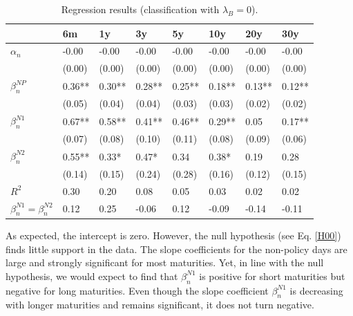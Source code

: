 \documentclass[11pt,a4paper,english,oneside]{book}
\numberwithin{equation}{chapter}
\begin{document}
\begin{table}[h] %
	\centering %
	\begin{tabular}{ p{2cm}  p{1cm} p{1cm} p{1cm} p{1cm} p{1cm} p{1cm} p{1cm} } %
		\toprule %
		& 6m & 1y & 3y & 5y & 10y & 20y & 30y \\
		\midrule %
		$\alpha_n$ & -0.00 & -0.00 & -0.00 & -0.00 & -0.00 & -0.00 & -0.00\\
		& (0.00) & (0.00) & (0.00) & (0.00) & (0.00) & (0.00) & (0.00)\\
		$\beta_n^{NP}$ & 0.36** & 0.30** & 0.28** & 0.25** & 0.18** & 0.13** & 0.12**\\
		& (0.05) & (0.04) & (0.04) & (0.03) & (0.03) & (0.02) & (0.02)\\
		$\beta_n^{N1}$ & 0.67** & 0.58** & 0.41** & 0.46** & 0.29** & 0.05 & 0.17**\\
		& (0.07) & (0.08) & (0.10) & (0.11) & (0.08) & (0.09) & (0.06)\\
		$\beta_n^{N2}$ & 0.55** & 0.33* & 0.47* & 0.34 & 0.38* & 0.19 & 0.28\\
		& (0.14) & (0.15) & (0.24) & (0.28) & (0.16) & (0.12) & (0.15)\\
		$R^2$ & 0.30 & 0.20 & 0.08 & 0.05 & 0.03 & 0.02 & 0.02\\
		$\beta_n^{N1} = \beta_n^{N2}$ & 0.12 & 0.25 & -0.06 & 0.12 & -0.09 & -0.14 & -0.11\\
		\bottomrule %
	\end{tabular}
	\caption{Regression results (classification with $\lambda_B=0$).} %
	\label{tab:reg1} %
\end{table}

As expected, the intercept is zero. However, the null hypothesis (see Eq. \ref{H00}) finds little support in the data. The slope coefficients for the non-policy days are large and strongly significant for most maturities. Yet, in line with the null hypothesis, we would expect to find that $\beta_n^{N1}$ is positive for short maturities but negative for long maturities. Even though the slope coefficient $\beta_n^{N1}$ is decreasing with longer maturities and remains significant, it does not turn negative. 
\end{document}
